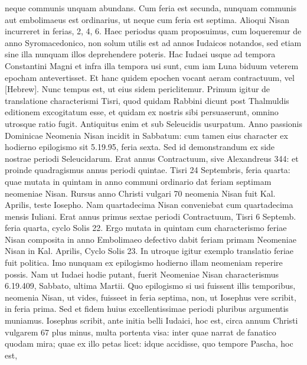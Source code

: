 neque communis unquam abundans.
%
Cum feria est secunda, nunquam
communis aut embolimaeus est ordinarius, ut neque cum feria
est septima.
Alioqui Nisan incurreret in ferias, 2, 4, 6.
Haec periodus
quam proposuimus, cum loqueremur de anno Syromacedonico, non
solum utilis est ad annos Iudaicos notandos, sed etiam sine illa nunquam
illos deprehendere poteris.
Hac Iudaei usque ad tempora Constantini
Magni et infra illa tempora usi sunt, cum iam Luna biduum
veterem epocham antevertisset.
Et hanc quidem epochen vocant
aeram contractuum, vel \texthebrew{[Hebrew]}.
Nunc tempus est, ut eius sidem periclitemur.
Primum igitur de translatione characterismi Tisri, quod
quidam Rabbini dicunt post Thalmuldis editionem excogitatum esse,
et quidam ex nostris sibi persuaserunt, omnino utrosque ratio fugit.
Antiquitus enim et sub Seleucidis usurpatum.
Anno passionis Dominicae
Neomenia Nisan incidit in Sabbatum: cum tamen eius character
ex hodierno epilogismo sit 5.19.95, feria sexta.
Sed id demonstrandum
ex side nostrae periodi Seleucidarum.
Erat annus Contractuum,
sive Alexandreus 344: et proinde quadragismus annus periodi
quintae. %
Tisri 24 Septembris, feria quarta: quae mutata in quintam
in anno communi ordinario dat feriam septimam neomeniae Nisan.
Rursus anno Christi vulgari 70 neomenia Nisan fuit Kal. %
 Aprilis, teste
Iosepho.
Nam quartadecima Nisan conveniebat cum quartadecima
mensis Iuliani.
Erat annus primus sextae periodi Contractuum, Tisri
6 Septemb. %
 feria quarta, cyclo Solis 22.
Ergo mutata in quintam
cum characterismo feriae Nisan composita in anno Embolimaeo defectivo
dabit feriam primam Neomeniae Nisan in Kal. %
 Aprilis, Cyclo
Solis 23.
In utroque igitur exemplo translatio feriae fuit politica.
Imo
nunquam ex epilogismo hodierno illam neomeniam reperire possis.
Nam ut Iudaei hodie putant, fuerit Neomeniae Nisan characterismus
6.19.409, Sabbato, ultima Martii.
Quo epilogismo si usi fuissent illis
temporibus, neomenia Nisan, ut vides, fuisseet in feria septima, non, ut
Iosephus vere scribit, in feria prima.
Sed et fidem huius excellentissimae
periodi pluribus argumentis muniamus.
Iosephus scribit, ante
initia belli Iudaici, hoc est, circa annum Christi vulgarem 67 plus minus,
multa portenta visa: inter quae narrat de fanatico quodam mira;
quae ex illo petas licet: idque accidisse, quo tempore Pascha, hoc est,
